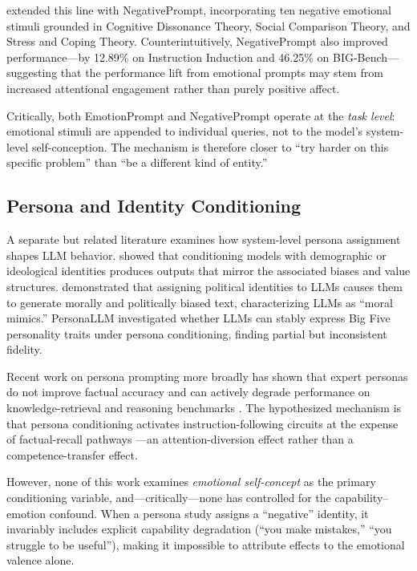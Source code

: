\documentclass[11pt,a4paper]{article}
\begin{document}
\citet{wang2024negativeprompt} extended this line with NegativePrompt, incorporating ten negative emotional stimuli grounded in Cognitive Dissonance Theory, Social Comparison Theory, and Stress and Coping Theory. Counterintuitively, NegativePrompt also improved performance—by 12.89\% on Instruction Induction and 46.25\% on BIG-Bench—suggesting that the performance lift from emotional prompts may stem from increased attentional engagement rather than purely positive affect.

Critically, both EmotionPrompt and NegativePrompt operate at the \emph{task level}: emotional stimuli are appended to individual queries, not to the model's system-level self-conception. The mechanism is therefore closer to ``try harder on this specific problem'' than ``be a different kind of entity.''

\subsection{Persona and Identity Conditioning}

A separate but related literature examines how system-level persona assignment shapes LLM behavior. \citet{gupta2024bias} showed that conditioning models with demographic or ideological identities produces outputs that mirror the associated biases and value structures. \citet{simmons2023moral} demonstrated that assigning political identities to LLMs causes them to generate morally and politically biased text, characterizing LLMs as ``moral mimics.'' PersonaLLM \citep{kabbara2024personallm} investigated whether LLMs can stably express Big Five personality traits under persona conditioning, finding partial but inconsistent fidelity.

Recent work on persona prompting more broadly has shown that expert personas do not improve factual accuracy and can actively degrade performance on knowledge-retrieval and reasoning benchmarks \citep{zheng2024helpful, basil2025pretend}. The hypothesized mechanism is that persona conditioning activates instruction-following circuits at the expense of factual-recall pathways \citep{xu2025prism}—an attention-diversion effect rather than a competence-transfer effect.

However, none of this work examines \emph{emotional self-concept} as the primary conditioning variable, and—critically—none has controlled for the capability--emotion confound. When a persona study assigns a ``negative'' identity, it invariably includes explicit capability degradation (``you make mistakes,'' ``you struggle to be useful''), making it impossible to attribute effects to the emotional valence alone.
\end{document}
